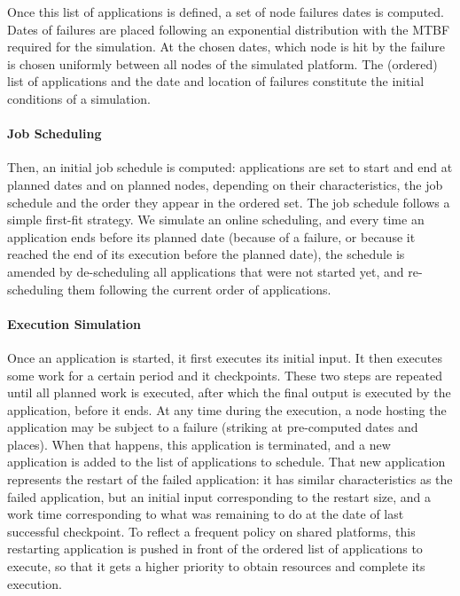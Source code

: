 Once this list of applications is defined, a set of node failures
dates is computed. Dates of failures are placed following an
exponential distribution with the MTBF required for the simulation. At
the chosen dates, which node is hit by the failure is chosen uniformly
between all nodes of the simulated platform. The (ordered) list of
applications and the date and location of failures constitute the
initial conditions of a simulation.

\paragraph*{Job Scheduling}
Then, an initial job schedule is computed: applications are set to
start and end at planned dates and on planned nodes, depending on
their characteristics, the job schedule and the order they appear in
the ordered set. The job schedule follows a simple first-fit
strategy. We simulate an online scheduling, and every time an
application ends before its planned date (because of a failure, or
because it reached the end of its execution before the planned date),
the schedule is amended by de-scheduling all applications that were
not started yet, and re-scheduling them following the current order of
applications.

\paragraph*{Execution Simulation}
Once an application is started, it first executes its initial
input. It then executes some work for a certain period and it
checkpoints. These two steps are repeated until all planned work is
executed, after which the final output is executed by the application,
before it ends. At any time during the execution, a node hosting the
application may be subject to a failure (striking at pre-computed
dates and places). When that happens, this application is terminated,
and a new application is added to the list of applications to
schedule. That new application represents the restart of the failed
application: it has similar characteristics as the failed application,
but an initial input corresponding to the restart size, and a work
time corresponding to what was remaining to do at the date of last
successful checkpoint. To reflect a frequent policy on shared
platforms, this restarting application is pushed in front of the
ordered list of applications to execute, so that it gets a higher
priority to obtain resources and complete its execution.

